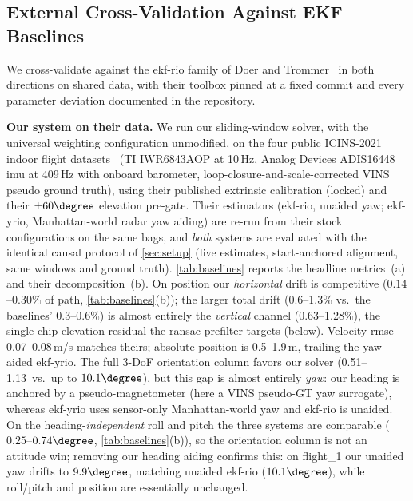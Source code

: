 \subsection{External Cross-Validation Against EKF Baselines}
\label{sec:baselines}
We cross-validate against the \ac{ekf}-\ac{rio} family of Doer and
Trommer~\cite{doer2020ekf,doer2021yrio} in both directions on shared
data, with their toolbox pinned at a fixed commit and every parameter
deviation documented in the repository.

\textbf{Our system on their data.}  We run our sliding-window solver,
with the universal weighting configuration unmodified, on the four
public ICINS-2021 indoor flight datasets~\cite{doer2021yrio}
(TI IWR6843AOP at 10\,Hz, Analog Devices ADIS16448 \ac{imu} at 409\,Hz with
onboard barometer, loop-closure-and-scale-corrected VINS pseudo ground
truth), using their published extrinsic calibration (locked) and
their $\pm 60\degree$ elevation pre-gate.  Their estimators
(\mbox{ekf-rio}, unaided yaw; \mbox{ekf-yrio}, Manhattan-world radar
yaw aiding) are re-run from their stock configurations on the same
bags, and \emph{both} systems are evaluated with the identical causal
protocol of \autoref{sec:setup} (live estimates, start-anchored
alignment, same windows and ground truth).
\autoref{tab:baselines} reports the headline metrics~(a) and their
decomposition~(b).  On position our \emph{horizontal} drift is
competitive ($0.14$--$0.30\%$ of path, \autoref{tab:baselines}(b)); the
larger total drift (0.6--1.3\% vs.\ the baselines' 0.3--0.6\%) is almost
entirely the \emph{vertical} channel (0.63--1.28\%), the single-chip
elevation residual the \ac{ransac} prefilter targets (below).  Velocity
\ac{rmse} 0.07--0.08\,m/s matches theirs; absolute position is
0.5--1.9\,m, trailing the yaw-aided ekf-yrio.
The full 3-DoF orientation column favors our solver
(0.51--1.13\degree\ vs.\ up to $10.1\degree$), but this gap is almost
entirely \emph{yaw}: our heading is anchored by a pseudo-magnetometer
(here a VINS pseudo-GT yaw surrogate), whereas
ekf-yrio uses sensor-only Manhattan-world yaw and ekf-rio is unaided.
On the heading-\emph{independent} roll and pitch the three systems are
comparable ($0.25$--$0.74\degree$, \autoref{tab:baselines}(b)),
so the orientation column is not an attitude win; removing our heading
aiding confirms this: on flight\_1 our unaided yaw drifts to
$9.9\degree$, matching unaided ekf-rio ($10.1\degree$), while roll/pitch
and position are essentially unchanged.

